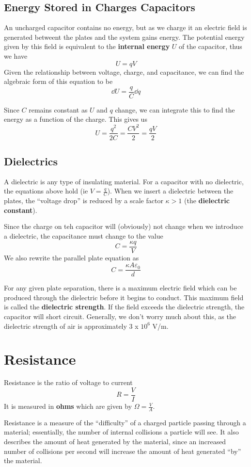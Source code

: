 \documentclass[12pt]{article}
\begin{document}
\subsection*{Energy Stored in Charges Capacitors}
An uncharged capacitor contains no energy, but as we charge it an electric field is generated betweent the plates and the system gains energy. The potential energy given by this field is equivalent to the {\bf internal energy} $U$ of the capacitor, thus we have \[ U = qV \] Given the relationship between voltage, charge, and capacitance, we can find the algebraic form of this equation to be \[ \dd U = \frac{q}{C} \dd q \]

Since $C$ remains constant as $U$ and $q$ change, we can integrate this to find the energy as a function of the charge. This gives us \[ U = \frac{q^2}{2C} = \frac{CV^2}{2} = \frac{qV}{2} \]

\subsection*{Dielectrics}
A dielectric is any type of insulating material. For a capacitor with no dielectric, the equations above hold (ie $V = \frac{q}{C}$). When we insert a dielectric between the plates, the ``voltage drop'' is reduced by a scale factor $\kappa > 1$ (the {\bf dielectric constant}).

Since the charge on teh capacitor will (obviously) not change when we introduce a dielectric, the capacitance must change to the value \[ C = \frac{\kappa q}{V} \] We also rewrite the parallel plate equation as \[ C = \frac{\kappa A \varepsilon_0}{d} \]

For any given plate separation, there is a maximum electric field which can be produced through the dielectric before it begins to conduct. This maximum field is called the {\bf dielectric strength}. If the field exceeds the dielectric strength, the capacitor will short circuit. Generally, we don't worry much about this, as the dielectric strength of air is approximately $3$ x $10^6$ V/m.

\section*{Resistance}
Resistance is the ratio of voltage to current \[ R = \frac{V}{I} \] It is measured in {\bf ohms}  which are given by $\Omega = \frac{V}{A}$.

Resistance is a measure of the ``difficulty'' of a charged particle passing through a material; essentially, the number of internal collisions a particle will see. It also describes the amount of heat generated by the material, since an increased number of collisions per second will increase the amount of heat generated ``by'' the material.
\end{document}
